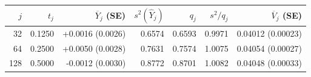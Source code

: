 \begin{tabular}{rrrrrrr}
\toprule
$j$ & $t_j$ & $\overline{Y}_j$ (SE) & $s^2(\widehat Y_j)$ & $q_j$ & $s^2/q_j$ & $\overline{V}_j$ (SE) \\
\midrule
32 & 0.1250 & +0.0016 (0.0026) & 0.6574 & 0.6593 & 0.9971 & 0.04012 (0.00023) \\
64 & 0.2500 & +0.0050 (0.0028) & 0.7631 & 0.7574 & 1.0075 & 0.04054 (0.00027) \\
128 & 0.5000 & -0.0012 (0.0030) & 0.8772 & 0.8701 & 1.0082 & 0.04048 (0.00033) \\
\bottomrule
\end{tabular}

